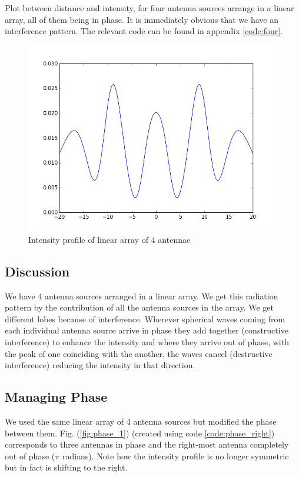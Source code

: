 Plot between distance and intensity, for four antenna sources arrange in a linear array, all of them being in phase. It is immediately obvious that we have an interference pattern. The relevant code can be found in appendix \ref{code:four}.

\begin{figure}[!h]
	\centering	
    \includegraphics[scale=0.45]{figure_2.png}
	\caption{Intensity profile of linear array of 4 antennae}
\end{figure}

\subsection{Discussion}
We have 4 antenna sources arranged in a linear array. We get this radiation pattern by the contribution of all the antenna sources in the array. We get different lobes because of interference. Wherever spherical waves coming from each individual antenna source arrive in phase they add together (constructive interference) to enhance the intensity and where they arrive out of phase, with the peak of one coinciding with the another, the waves cancel (destructive interference) reducing the intensity in that direction.

\subsection{Managing Phase}

We used the same linear array of 4 antenna sources but modified the phase between them. Fig. (\ref{fig:phase_1}) (created using code \ref{code:phase_right}) corresponds to three antennas in phase and the right-most antenna completely out of phase ($\pi$ radians). Note how the intensity profile is no longer symmetric but in fact is shifting to the right. 

